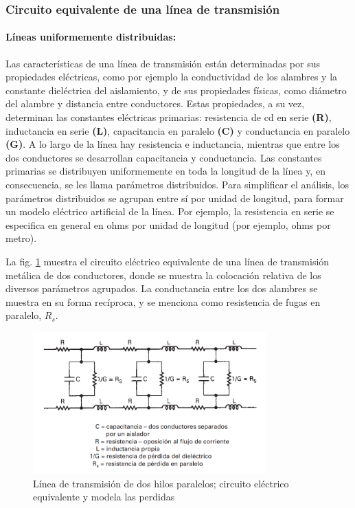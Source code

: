         \subsubsection{Circuito equivalente de una línea de transmisión}

            \paragraph{Líneas uniformemente distribuidas:}

            Las características de una línea de transmisión están determinadas por sus propiedades eléctricas, como por ejemplo la conductividad de los alambres y la constante dieléctrica del aislamiento, y de sus propiedades físicas, como diámetro del alambre y distancia entre conductores. Estas propiedades, a su vez, determinan las constantes eléctricas primarias: resistencia de cd en serie \textbf{(R)}, inductancia en serie \textbf{(L)}, capacitancia en paralelo \textbf{(C)} y conductancia en paralelo \textbf{(G)}. A lo largo de la línea hay resistencia e inductancia, mientras que entre los dos conductores se desarrollan capacitancia y conductancia. Las constantes primarias se distribuyen uniformemente en toda la longitud de la línea y, en consecuencia, se les llama parámetros distribuidos. Para simplificar el análisis, los parámetros distribuidos se agrupan entre sí por unidad de longitud, para formar un modelo eléctrico artificial de la línea. Por ejemplo, la resistencia en serie se especifica en general en ohms por unidad de longitud (por ejemplo, ohms por metro).

            La fig. \ref{fig:circ_lt} muestra el circuito eléctrico equivalente de una línea de transmisión metálica de dos conductores, donde se muestra la colocación relativa de los diversos parámetros agrupados. La conductancia entre los dos alambres se muestra en su forma recíproca, y se menciona como resistencia de fugas en paralelo, $R_s$.

            \begin{figure}[H]
                \centering
                \includegraphics[width=0.8\textwidth]{imagenes/circ_lt.png}
                \caption{Línea de transmisión de dos hilos paralelos; circuito eléctrico equivalente y modela las perdidas}
                \label{fig:circ_lt}
            \end{figure}

